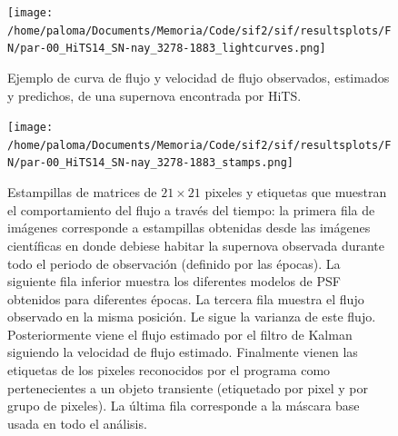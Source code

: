 \begin{figure}
\centering
\texttt{[image: /home/paloma/Documents/Memoria/Code/sif2/sif/resultsplots/FN/par-00\_HiTS14\_SN-nay\_3278-1883\_lightcurves.png]}
\caption{Ejemplo de curva de flujo y velocidad de flujo observados, estimados y predichos, de una supernova encontrada por HiTS. }
\label{fig:lc_result}
\end{figure}

\begin{figure}
\centering
\texttt{[image: /home/paloma/Documents/Memoria/Code/sif2/sif/resultsplots/FN/par-00\_HiTS14\_SN-nay\_3278-1883\_stamps.png]}
\caption{Estampillas de matrices de $21 \times 21$ pixeles y etiquetas que muestran el comportamiento del flujo a trav\'es del tiempo: la primera fila de im\'agenes corresponde a estampillas obtenidas desde las im\'agenes cient\'ificas en donde debiese habitar la supernova observada durante todo el periodo de observaci\'on (definido por las \'epocas). La siguiente fila inferior muestra los diferentes modelos de PSF obtenidos para diferentes \'epocas. La tercera fila muestra el flujo observado en la misma posici\'on. Le sigue la varianza de este flujo. Posteriormente viene el flujo estimado por el filtro de Kalman siguiendo la velocidad de flujo estimado. Finalmente vienen las etiquetas de los pixeles reconocidos por el programa como pertenecientes a un objeto transiente (etiquetado por pixel y por grupo de pixeles). La \'ultima fila corresponde a la m\'ascara base usada en todo el an\'alisis.}
\label{fig:stamps_result}
\end{figure}
\bigskip

